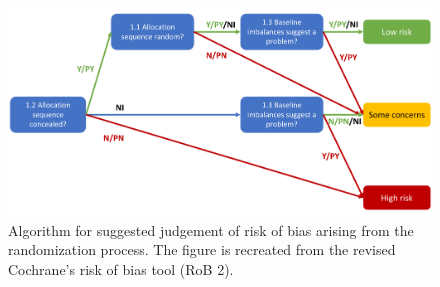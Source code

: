 \documentclass[sn-mathphys,Numbered]{sn-jnl}%
\theoremstyle{thmstyleone}%
\theoremstyle{thmstyletwo}%
\theoremstyle{thmstylethree}%
\begin{document}
%
%
%
\begin{figure}
    \centering
    \includegraphics[width=0.60\columnwidth]{figures/flowchart.pdf}
    \caption{Algorithm for suggested judgement of risk of bias arising from the randomization process. The figure is recreated from the revised Cochrane's risk of bias tool (RoB 2).~\cite{sterne2019rob}}
    \label{fig:flowchart}
\end{figure}
%
%
%

%
%
%
\end{document}
